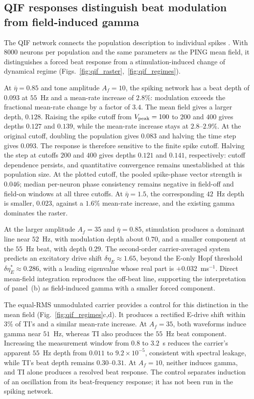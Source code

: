 \documentclass[11pt,a4paper]{article}
\begin{document}
\subsection{QIF responses distinguish beat modulation from field-induced gamma}\label{sec:qif}
The QIF network connects the population description to individual spikes
\cite{montbrio2015,ruffini2025rosetta,clusella2023}. With $8000$ neurons per population
and the same parameters as the PING mean field, it distinguishes a forced beat
response from a stimulation-induced change of dynamical regime
(Figs.~\ref{fig:qif_raster},~\ref{fig:qif_regimes}).

At $\bar\eta=0.85$ and tone amplitude $A_f=10$, the spiking network has a beat
depth of $0.093$ at $55$~Hz and a mean-rate increase of $2.8\%$: modulation exceeds
the fractional mean-rate change by a factor of $3.4$. The mean field gives a
larger depth, $0.128$. Raising the spike cutoff from $V_{\rm peak}=100$ to
$200$ and $400$ gives depths $0.127$ and $0.139$, while the mean-rate increase
stays at $2.8$--$2.9\%$. At the original cutoff, doubling the population gives
$0.083$ and halving the time step gives $0.093$. The response is therefore
sensitive to the finite spike cutoff. Halving the step at cutoffs $200$ and
$400$ gives depths $0.121$ and $0.141$, respectively: cutoff dependence persists,
and quantitative convergence remains unestablished at this population size.
At the plotted cutoff, the pooled spike-phase vector strength is $0.046$;
median per-neuron phase consistency remains negative in field-off and field-on
windows at all three cutoffs. At
$\bar\eta=1.5$, the corresponding $42$~Hz depth is smaller, $0.023$, against a
$1.6\%$ mean-rate increase, and the existing gamma dominates the raster.

At the larger amplitude $A_f=35$ and $\bar\eta=0.85$, stimulation produces
a dominant line near $52$~Hz, with modulation depth about $0.70$, and a smaller component
at the $55$~Hz beat, with depth $0.29$. The second-order carrier-averaged system
predicts an excitatory drive shift $\delta\eta_E\approx1.65$, beyond the E-only
Hopf threshold $\delta\eta_E^*\approx0.286$, with a leading eigenvalue whose real
part is $+0.032$~ms$^{-1}$. Direct mean-field integration reproduces the off-beat
line, supporting the interpretation of panel~(b) as field-induced gamma with a
smaller forced component.

The equal-RMS unmodulated carrier provides a control for this distinction in
the mean field (Fig.~\ref{fig:qif_regimes}c,d). It produces a rectified E-drive
shift within $3\%$ of TI's and a similar mean-rate increase. At $A_f=35$, both
waveforms induce gamma near $51$~Hz, whereas TI also produces the $55$~Hz beat
component. Increasing the measurement window from $0.8$ to $3.2$~s reduces
the carrier's apparent $55$~Hz depth from $0.011$ to $9.2\times10^{-5}$,
consistent with spectral leakage, while TI's beat depth remains $0.30$--$0.31$.
At $A_f=10$, neither induces gamma, and TI alone produces a resolved beat
response. The control separates induction of an oscillation from its
beat-frequency response; it has not been run in the spiking network.
\end{document}
